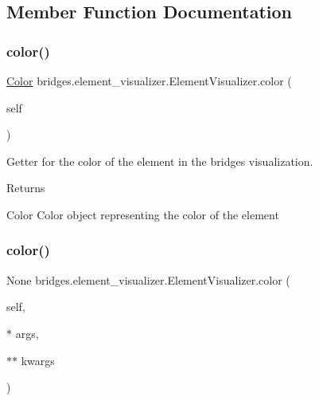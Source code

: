 \subsection{Member Function Documentation}
\mbox{\label{classbridges_1_1element__visualizer_1_1_element_visualizer_a87d713b84157c9cb59d3185d9e364e17}} 
\subsubsection{\texorpdfstring{color()}{color()}\hspace{0.1cm}{\footnotesize\ttfamily [1/2]}}
{\footnotesize\ttfamily  \mbox{\hyperlink{classbridges_1_1color_1_1_color}{Color}} bridges.\+element\+\_\+visualizer.\+Element\+Visualizer.\+color (\begin{DoxyParamCaption}\item[{}]{self }\end{DoxyParamCaption})}



Getter for the color of the element in the bridges visualization. 

\begin{DoxyReturn}{Returns}


Color Color object representing the color of the element 
\end{DoxyReturn}
\mbox{\label{classbridges_1_1element__visualizer_1_1_element_visualizer_a07fe381e92e2a62c7e62c425189d790e}} 
\subsubsection{\texorpdfstring{color()}{color()}\hspace{0.1cm}{\footnotesize\ttfamily [2/2]}}
{\footnotesize\ttfamily  None bridges.\+element\+\_\+visualizer.\+Element\+Visualizer.\+color (\begin{DoxyParamCaption}\item[{}]{self,  }\item[{$\ast$}]{args,  }\item[{$\ast$$\ast$}]{kwargs }\end{DoxyParamCaption})}



